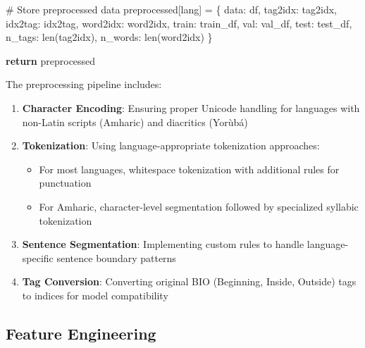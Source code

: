 \documentclass[
]{article}
\newenvironment{Shaded}{\begin{snugshade}}{\end{snugshade}}
\newcommand{\BuiltInTok}[1]{\textcolor[rgb]{0.00,0.23,0.31}{#1}}
\newcommand{\CommentTok}[1]{\textcolor[rgb]{0.37,0.37,0.37}{#1}}
\newcommand{\ControlFlowTok}[1]{\textcolor[rgb]{0.00,0.23,0.31}{\textbf{#1}}}
\newcommand{\NormalTok}[1]{\textcolor[rgb]{0.00,0.23,0.31}{#1}}
\newcommand{\OperatorTok}[1]{\textcolor[rgb]{0.37,0.37,0.37}{#1}}
\newcommand{\StringTok}[1]{\textcolor[rgb]{0.13,0.47,0.30}{#1}}
\providecommand{\tightlist}{%
  \setlength{\itemsep}{0pt}\setlength{\parskip}{0pt}}\usepackage{longtable,booktabs,array}
\begin{document}
\begin{Shaded}
\begin{Highlighting}[]
        \CommentTok{\# Store preprocessed data}
\NormalTok{        preprocessed[lang] }\OperatorTok{=}\NormalTok{ \{}
            \StringTok{\textquotesingle{}data\textquotesingle{}}\NormalTok{: df,}
            \StringTok{\textquotesingle{}tag2idx\textquotesingle{}}\NormalTok{: tag2idx, }\StringTok{\textquotesingle{}idx2tag\textquotesingle{}}\NormalTok{: idx2tag,}
            \StringTok{\textquotesingle{}word2idx\textquotesingle{}}\NormalTok{: word2idx,}
            \StringTok{\textquotesingle{}train\textquotesingle{}}\NormalTok{: train\_df, }\StringTok{\textquotesingle{}val\textquotesingle{}}\NormalTok{: val\_df, }\StringTok{\textquotesingle{}test\textquotesingle{}}\NormalTok{: test\_df,}
            \StringTok{\textquotesingle{}n\_tags\textquotesingle{}}\NormalTok{: }\BuiltInTok{len}\NormalTok{(tag2idx), }\StringTok{\textquotesingle{}n\_words\textquotesingle{}}\NormalTok{: }\BuiltInTok{len}\NormalTok{(word2idx)}
\NormalTok{        \}}
    
    \ControlFlowTok{return}\NormalTok{ preprocessed}
\end{Highlighting}
\end{Shaded}

The preprocessing pipeline includes:

\begin{enumerate}
\def\labelenumi{\arabic{enumi}.}
\item
  \textbf{Character Encoding}: Ensuring proper Unicode handling for
  languages with non-Latin scripts (Amharic) and diacritics (Yorùbá)
\item
  \textbf{Tokenization}: Using language-appropriate tokenization
  approaches:

  \begin{itemize}
  \tightlist
  \item
    For most languages, whitespace tokenization with additional rules
    for punctuation
  \item
    For Amharic, character-level segmentation followed by specialized
    syllabic tokenization
  \end{itemize}
\item
  \textbf{Sentence Segmentation}: Implementing custom rules to handle
  language-specific sentence boundary patterns
\item
  \textbf{Tag Conversion}: Converting original BIO (Beginning, Inside,
  Outside) tags to indices for model compatibility
\end{enumerate}

\subsection{Feature Engineering}\label{feature-engineering}
\end{document}

